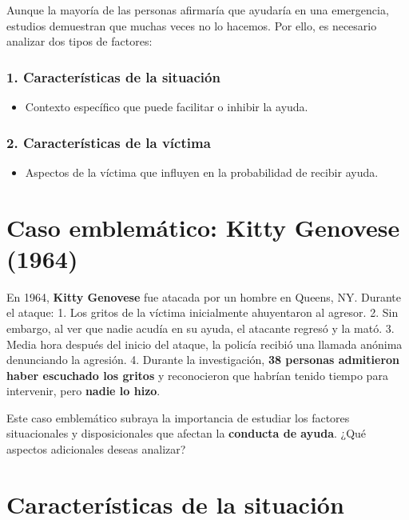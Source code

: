 \documentclass[
]{book}
\providecommand{\tightlist}{%
  \setlength{\itemsep}{0pt}\setlength{\parskip}{0pt}}
\begin{document}
Aunque la mayoría de las personas afirmaría que ayudaría en una emergencia, estudios demuestran que muchas veces no lo hacemos. Por ello, es necesario analizar dos tipos de factores:

\subsubsection{\texorpdfstring{1. \textbf{Características de la situación}}{1. Características de la situación}}\label{caracteruxedsticas-de-la-situaciuxf3n}

\begin{itemize}
\tightlist
\item
  Contexto específico que puede facilitar o inhibir la ayuda.
\end{itemize}

\subsubsection{\texorpdfstring{2. \textbf{Características de la víctima}}{2. Características de la víctima}}\label{caracteruxedsticas-de-la-vuxedctima}

\begin{itemize}
\tightlist
\item
  Aspectos de la víctima que influyen en la probabilidad de recibir ayuda.
\end{itemize}

\section{Caso emblemático: Kitty Genovese (1964)}\label{caso-emblemuxe1tico-kitty-genovese-1964}

En 1964, \textbf{Kitty Genovese} fue atacada por un hombre en Queens, NY. Durante el ataque:
1. Los gritos de la víctima inicialmente ahuyentaron al agresor.
2. Sin embargo, al ver que nadie acudía en su ayuda, el atacante regresó y la mató.
3. Media hora después del inicio del ataque, la policía recibió una llamada anónima denunciando la agresión.
4. Durante la investigación, \textbf{38 personas admitieron haber escuchado los gritos} y reconocieron que habrían tenido tiempo para intervenir, pero \textbf{nadie lo hizo}.

Este caso emblemático subraya la importancia de estudiar los factores situacionales y disposicionales que afectan la \textbf{conducta de ayuda}. ¿Qué aspectos adicionales deseas analizar?

\section{Características de la situación}\label{caracteruxedsticas-de-la-situaciuxf3n-1}
\end{document}

